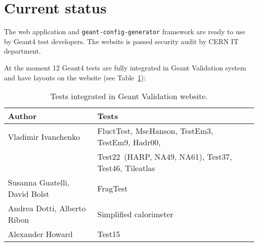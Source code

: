 \section{Current status}
\label{sec-status}

The web application and {\tt geant-config-generator} framework are ready to use by Geant4 test developers. The website is passed security audit by CERN IT department.

At the moment 12 Geant4 tests are fully integrated in Geant Validation system and have layouts on the website (see Table~\ref{table:tests}):

\begin{table}[h]
\centering
\begin{tabular}{lll}
\hline
Author & Tests  \\\hline
Vladimir Ivanchenko & FluctTest, MscHanson, TestEm3, TestEm9, Hadr00, \\ 
& Test22~(HARP, NA49, NA61), Test37, Test46, Tileatlas \\
Susanna Guatelli, David Bolst & FragTest \\
Andrea Dotti, Alberto Ribon & Simplified calorimeter \\
Alexander Howard & Test15 \\

\end{tabular}
\caption{Tests integrated in Geant Validation website.}
\label{table:tests}
\end{table}


